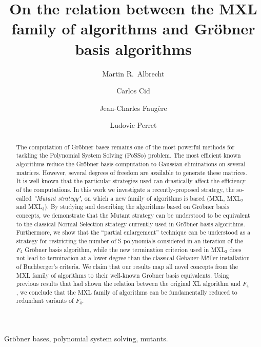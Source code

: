 \documentclass[preprint,draft]{elsarticle}
\begin{document}
\title{On the relation between the MXL family of algorithms and Gr\"obner basis algorithms}
\author[lip6]{Martin R.~Albrecht}
\author[rhul]{Carlos Cid} 
\author[lip6]{Jean-Charles Faug\`ere}
\author[lip6]{Ludovic Perret}

\address[lip6]{
INRIA, Paris-Rocquencourt Center, POLSYS Project\\
UPMC Univ Paris 06, UMR 7606, LIP6, F-75005, Paris, France\\
CNRS, UMR 7606, LIP6, F-75005, Paris, France\\
}
\address[rhul]{Information Security Group, Royal Holloway, University of London, UK}


\begin{abstract}
The computation of Gr\"obner bases remains one of the most powerful methods for tackling the Polynomial System Solving (PoSSo) problem. 
The most efficient known algorithms reduce the Gr\"obner basis computation to Gaussian
eliminations on several matrices. However, several degrees of freedom are available to generate these matrices. It is well known that the particular strategies used can drastically affect the efficiency of the computations. 
In this work we investigate a recently-proposed strategy, the so-called {\it ``Mutant strategy"}, on which a new family of algorithms is based (MXL, MXL$_2$ and MXL$_3$).  By studying and describing the algorithms based on Gr\"obner basis concepts,
we demonstrate that the Mutant strategy can be understood to be equivalent to the classical Normal Selection strategy currently used in Gr\"obner basis algorithms.  Furthermore, we show that the ``partial enlargement'' technique can be understood as a strategy for restricting the number of S-polynomials considered in an iteration of the $F_4$ Gr\"obner basis algorithm,
while the new termination criterion used in MXL$_3$ does not lead to termination at a lower degree than the classical 
Gebauer-M\"oller installation of Buchberger's criteria.
We claim that our results map all novel concepts from the MXL family of algorithms to their well-known Gr\"obner basis equivalents. 
Using previous results that had shown the relation between the original XL algorithm and $F_4$, we conclude that  the MXL family of algorithms can be fundamentally reduced to redundant variants of $F_4$.
\end{abstract}

\begin{keyword}
Gr\"obner bases, polynomial system solving, mutants.
\end{keyword}
\maketitle 
\end{document}
